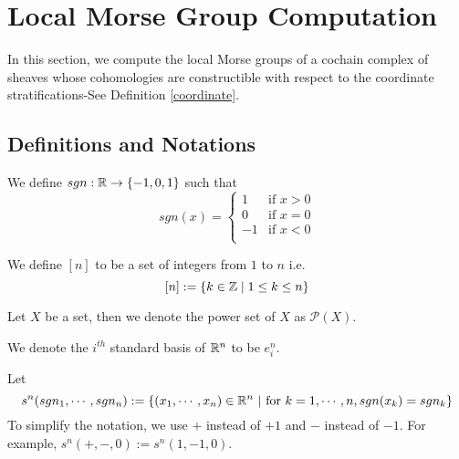 \section{Local Morse Group Computation}
In this section, we compute the local Morse groups of a cochain complex of sheaves whose cohomologies are constructible with respect to the coordinate stratifications-See Definition \ref{coordinate}.
\subsection*{Definitions and Notations}
\begin{definition}
We define $sgn : \mathbb{R} \rightarrow \{-1,0,1\}$ such that
\[
sgn(x)=
\begin{cases}
    1 & \text{if } x>0\\
    0 & \text{if } x=0\\
    -1 & \text{if } x<0\\
\end{cases}
\]
\end{definition}
\begin{definition}
We define $[n]$ to be a set of integers from $1$ to $n$ i.e.
\[
[n] := \{k \in \mathbb{Z} \mid 1\leq k \leq n\}
\]
\end{definition}
\begin{definition}
Let $X$ be a set, then we denote the power set of $X$ as $\mathcal{P}(X)$.
\end{definition}
\begin{definition}
We denote the $i^{th}$ standard basis of $\mathbb{R}^n$ to be $e^n_i$.
\end{definition}
\begin{definition}
Let
\[
s^n(sgn_1,\cdots,sgn_n):= \{(x_1,\cdots,x_n)\in \mathbb{R}^n ~|~ \text{for }k=1,\cdots,n, sgn(x_k)=sgn_k\}
\]
To simplify the notation, we use $+$ instead of $+1$ and $-$ instead of $-1$. For example, $s^n(+,-,0):= s^n(1,-1,0)$.
\end{definition}
